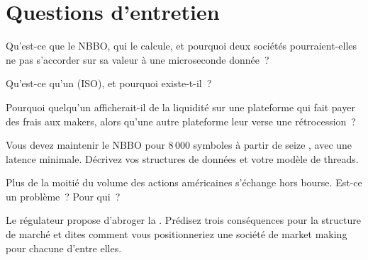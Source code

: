 \section{Questions d'entretien}

\begin{interviewq}\label{iq:m1:us-equity-market-structure:1}
Qu'est-ce que le NBBO, qui le calcule, et pourquoi deux sociétés pourraient-elles ne pas s'accorder
sur sa valeur à une microseconde donnée~?
\end{interviewq}

\begin{interviewq}\label{iq:m1:us-equity-market-structure:2}
Qu'est-ce qu'un  (ISO), et pourquoi existe-t-il~?
\end{interviewq}

\begin{interviewq}\label{iq:m1:us-equity-market-structure:3}
Pourquoi quelqu'un afficherait-il de la liquidité sur une plateforme qui fait payer
des frais aux makers, alors qu'une autre plateforme leur verse une rétrocession~?
\end{interviewq}

\begin{interviewq}\label{iq:m1:us-equity-market-structure:4}
Vous devez maintenir le NBBO pour 8\,000 symboles à partir de seize , avec
une latence minimale. Décrivez vos structures de données et votre modèle de threads.
\end{interviewq}

\begin{interviewq}\label{iq:m1:us-equity-market-structure:5}
Plus de la moitié du volume des actions américaines s'échange hors bourse. Est-ce un problème~?
Pour qui~?
\end{interviewq}

\begin{interviewq}\label{iq:m1:us-equity-market-structure:6}
Le régulateur propose d'abroger la . Prédisez trois
conséquences pour la structure de marché et dites comment vous positionneriez
une société de market making pour chacune d'entre elles.
\end{interviewq}
